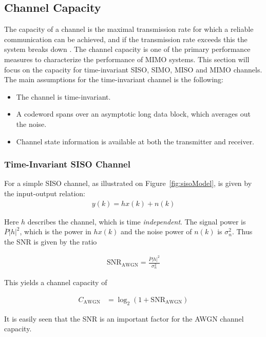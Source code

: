 \subsection{Channel Capacity}
\def\snr{\text{SNR}_{\text{AWGN}}}
\def\PP{\overline{P}}
\def\CC{C_{\text{AWGN}}}

The capacity of a channel is the maximal transmission rate for which a reliable communication can be achieved, and if the transmission rate exceeds this the system breaks down \cite{Tim2012Practical}. The channel capacity is one of the primary performance measures to characterize the performance of MIMO systems\cite{Tim2012Practical}. This section will focus on the capacity for time-invariant SISO, SIMO, MISO and MIMO channels. The main assumptions for the time-invariant channel is the following\cite{Tim2012Practical}: 
\begin{itemize}
\item The channel is time-invariant.
\item A codeword spans over an asymptotic long data block, which averages out the noise.
\item Channel state information is available at both the transmitter and receiver. 
\end{itemize}

\subsubsection{Time-Invariant SISO Channel}
For a simple SISO channel, as illustrated on Figure~\ref{fig:sisoModel}, is given by the input-output relation:
\begin{align*}
  y(k) = h x(k) + n(k)
\end{align*}

Here $h$ describes the channel, which is time \emph{independent}. The signal power is $\PP |h|^2$, which is the power in $h x(k)$ and the noise power of $n(k)$ is $\sigma_n^2$. Thus the SNR is given by the ratio

\begin{align*}
  \snr = \frac{\PP |h|^2}{\sigma_n^2}
\end{align*}

This yields a channel capacity of 

\begin{align*}
      \CC &= \log_2 \left( 1 + \snr \right)
\end{align*}

It is easily seen that the SNR is an important factor for the AWGN channel capacity.

